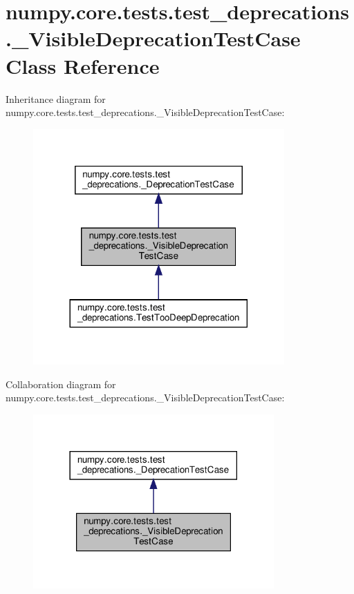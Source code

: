 \hypertarget{classnumpy_1_1core_1_1tests_1_1test__deprecations_1_1__VisibleDeprecationTestCase}{}\section{numpy.\+core.\+tests.\+test\+\_\+deprecations.\+\_\+\+Visible\+Deprecation\+Test\+Case Class Reference}
\label{classnumpy_1_1core_1_1tests_1_1test__deprecations_1_1__VisibleDeprecationTestCase}


Inheritance diagram for numpy.\+core.\+tests.\+test\+\_\+deprecations.\+\_\+\+Visible\+Deprecation\+Test\+Case\+:
\nopagebreak
\begin{figure}[H]
\begin{center}
\leavevmode
\includegraphics[width=272pt]{classnumpy_1_1core_1_1tests_1_1test__deprecations_1_1__VisibleDeprecationTestCase__inherit__graph}
\end{center}
\end{figure}


Collaboration diagram for numpy.\+core.\+tests.\+test\+\_\+deprecations.\+\_\+\+Visible\+Deprecation\+Test\+Case\+:
\nopagebreak
\begin{figure}[H]
\begin{center}
\leavevmode
\includegraphics[width=261pt]{classnumpy_1_1core_1_1tests_1_1test__deprecations_1_1__VisibleDeprecationTestCase__coll__graph}
\end{center}
\end{figure}
